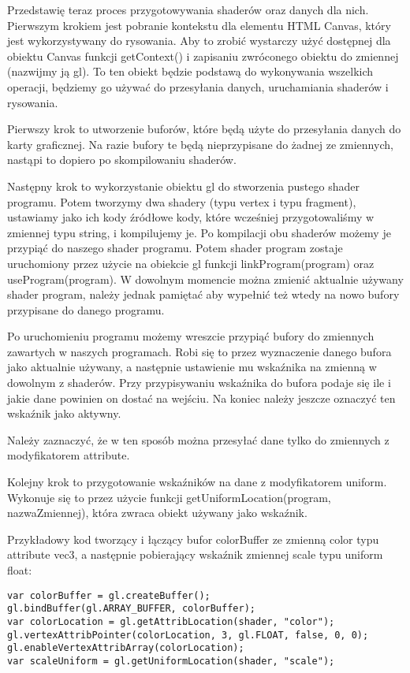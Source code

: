 Przedstawię teraz proces przygotowywania shaderów oraz danych dla nich. Pierwszym krokiem jest pobranie kontekstu dla elementu HTML Canvas, który jest wykorzystywany do rysowania. Aby to zrobić wystarczy użyć dostępnej dla obiektu Canvas funkcji getContext() i zapisaniu zwróconego obiektu do zmiennej (nazwijmy ją gl). To ten obiekt będzie podstawą do wykonywania wszelkich operacji, będziemy go używać do przesyłania danych, uruchamiania shaderów i rysowania.

Pierwszy krok to utworzenie buforów, które będą użyte do przesyłania danych do karty graficznej. Na razie bufory te będą nieprzypisane do żadnej ze zmiennych, nastąpi to dopiero po skompilowaniu shaderów.

Następny krok to wykorzystanie obiektu gl do stworzenia pustego shader programu. Potem tworzymy dwa shadery (typu vertex i typu fragment), ustawiamy jako ich kody źródłowe kody, które wcze\'sniej przygotowali\'smy w zmiennej typu string, i kompilujemy je. Po kompilacji obu shaderów możemy je przypiąć do naszego shader programu. Potem shader program zostaje uruchomiony przez użycie na obiekcie gl funkcji linkProgram(program) oraz useProgram(program). W dowolnym momencie można zmienić aktualnie używany shader program, należy jednak pamiętać aby wypełnić też wtedy na nowo bufory przypisane do danego programu.

Po uruchomieniu programu możemy wreszcie przypiąć bufory do zmiennych zawartych w naszych programach. Robi się to przez wyznaczenie danego bufora jako aktualnie używany, a następnie ustawienie mu wskaźnika na zmienną w dowolnym z shaderów. Przy przypisywaniu wskaźnika do bufora podaje się ile i jakie dane powinien on dostać na wej\'sciu. Na koniec należy jeszcze oznaczyć ten wskaźnik jako aktywny.

Należy zaznaczyć, że w ten sposób można przesyłać dane tylko do zmiennych z modyfikatorem attribute.

Kolejny krok to przygotowanie wskaźników na dane z modyfikatorem uniform. Wykonuje się to przez użycie funkcji getUniformLocation(program, nazwaZmiennej), która zwraca obiekt używany jako wskaźnik.

\noindent Przykładowy kod tworzący i łączący bufor colorBuffer ze zmienną color typu attribute vec3, a następnie pobierający wskaźnik zmiennej scale typu uniform float:
\begin{lstlisting}
var colorBuffer = gl.createBuffer();
gl.bindBuffer(gl.ARRAY_BUFFER, colorBuffer);
var colorLocation = gl.getAttribLocation(shader, "color");
gl.vertexAttribPointer(colorLocation, 3, gl.FLOAT, false, 0, 0);
gl.enableVertexAttribArray(colorLocation);
var scaleUniform = gl.getUniformLocation(shader, "scale");
\end{lstlisting}\bigskip

